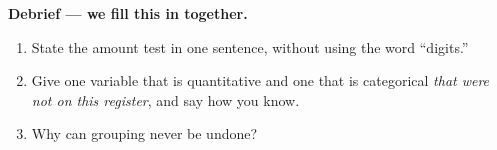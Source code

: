 \documentclass[10pt]{article}
\newcommand{\answerspace}[2]{\par\nopagebreak\noindent\begin{minipage}[t][#1][t]{\linewidth}%
  \color{keyred}\bfseries #2\end{minipage}\par}
\begin{document}
\vspace{0.07in}

\boxguard[18]
\begin{reflectionbox}
\small
\textbf{Debrief --- we fill this in together.}
\begin{enumerate}[leftmargin=1.9em, itemsep=6pt]
  \item State the amount test in one sentence, without using the word ``digits.''
        \answerspace{1.0cm}{}
  \item Give one variable that is quantitative and one that is categorical \emph{that were not
        on this register}, and say how you know.
        \answerspace{1.2cm}{}
  \item Why can grouping never be undone?
        \answerspace{1.0cm}{}
\end{enumerate}
\end{reflectionbox}
\end{document}
